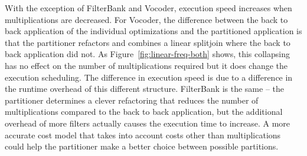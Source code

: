 With the exception of FilterBank and Vocoder, execution speed increases
when multiplications are decreased. For Vocoder, the difference between the
back to back application of the individual optimizations
and the partitioned application is that the partitioner refactors and combines
a linear splitjoin where the back to back application did not. As 
Figure~\ref{fig:linear-freq-both} shows, this collapsing has no effect on the number
of multiplications required but it does change the execution scheduling.
The difference in execution speed is due to a difference in the runtime overhead of 
this different structure. FilterBank is the same -- the partitioner 
determines a clever refactoring that reduces the number of multiplications
compared to the back to back application, but the additional overhead of more filters
actually causes the execution time to increase. A more accurate cost
model that takes into account costs other than multiplications
could help the partitioner make a better choice between possible partitions.

